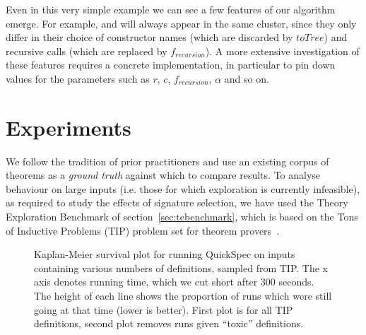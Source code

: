 Even in this very simple example we can see a few features of our algorithm
emerge. For example,  and  will always appear in the same
cluster, since they only differ in their choice of constructor names (which are
discarded by $toTree$) and recursive calls (which are replaced by
$f_{recursion}$). A more extensive investigation of these features requires a
concrete implementation, in particular to pin down values for the parameters
such as $r$, $c$, $f_{recursion}$, $\alpha$ and so on.

\fi

\section{Experiments}

%
%
%
%

We follow the tradition of prior practitioners and use an existing corpus of
theorems as a \emph{ground truth} against which to compare results. To analyse
behaviour on large inputs (i.e. those for which exploration is currently
infeasible), as required to study the effects of signature selection, we have
used the Theory Exploration Benchmark of section~\ref{sec:tebenchmark}, which is
based on the Tons of Inductive Problems (TIP) problem set for theorem
provers~\cite{claessen2015tip}.

\begin{figure}
  \scalebox{0.45}{}
  \scalebox{0.45}{}
  \caption{Kaplan-Meier survival plot for running QuickSpec on inputs
    containing various numbers of definitions, sampled from TIP. The x axis
    denotes running time, which we cut short after 300 seconds. The height of
    each line shows the proportion of \qspec{} runs which were still going at
    that time (lower is better). First plot is for all TIP definitions, second
    plot removes runs given ``toxic'' definitions.}
  \label{fig:survival}
\end{figure}

